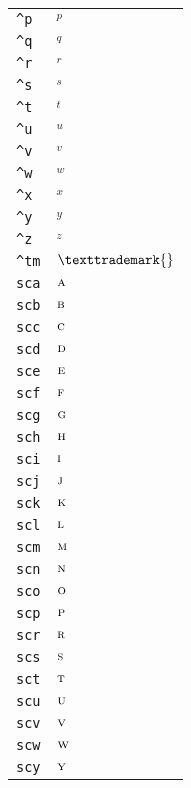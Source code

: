 \begin{longtable}{ll}
\texttt{\textasciicircum p}&${}^p{}$\\
\texttt{\textasciicircum q}&${}^q{}$\\
\texttt{\textasciicircum r}&${}^r{}$\\
\texttt{\textasciicircum s}&${}^s{}$\\
\texttt{\textasciicircum t}&${}^t{}$\\
\texttt{\textasciicircum u}&${}^u{}$\\
\texttt{\textasciicircum v}&${}^v{}$\\
\texttt{\textasciicircum w}&${}^w{}$\\
\texttt{\textasciicircum x}&${}^x{}$\\
\texttt{\textasciicircum y}&${}^y{}$\\
\texttt{\textasciicircum z}&${}^z{}$\\
\texttt{\textasciicircum tm}&${}\texttrademark{}$\\
\texttt{sca}&${}{\textsc{a}}{}$\\
\texttt{scb}&${}{\textsc{b}}{}$\\
\texttt{scc}&${}{\textsc{c}}{}$\\
\texttt{scd}&${}{\textsc{d}}{}$\\
\texttt{sce}&${}{\textsc{e}}{}$\\
\texttt{scf}&${}{\textsc{f}}{}$\\
\texttt{scg}&${}{\textsc{g}}{}$\\
\texttt{sch}&${}{\textsc{h}}{}$\\
\texttt{sci}&${}{\textsc{i}}{}$\\
\texttt{scj}&${}{\textsc{j}}{}$\\
\texttt{sck}&${}{\textsc{k}}{}$\\
\texttt{scl}&${}{\textsc{l}}{}$\\
\texttt{scm}&${}{\textsc{m}}{}$\\
\texttt{scn}&${}{\textsc{n}}{}$\\
\texttt{sco}&${}{\textsc{o}}{}$\\
\texttt{scp}&${}{\textsc{p}}{}$\\
\texttt{scr}&${}{\textsc{r}}{}$\\
\texttt{scs}&${}{\textsc{s}}{}$\\
\texttt{sct}&${}{\textsc{t}}{}$\\
\texttt{scu}&${}{\textsc{u}}{}$\\
\texttt{scv}&${}{\textsc{v}}{}$\\
\texttt{scw}&${}{\textsc{w}}{}$\\
\texttt{scy}&${}{\textsc{y}}{}$\\

\end{longtable}
